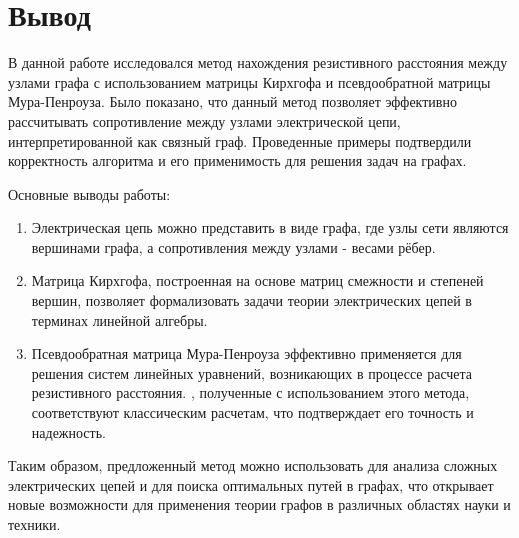 \documentclass{article}
\begin{document}
	
	\section{Вывод}
	В данной работе исследовался метод нахождения резистивного расстояния между узлами графа с использованием матрицы Кирхгофа и псевдообратной матрицы Мура-Пенроуза. Было показано, что данный метод позволяет эффективно рассчитывать сопротивление между узлами электрической цепи, интерпретированной как связный граф. Проведенные примеры подтвердили корректность алгоритма и его применимость для решения задач на графах.
	
	Основные выводы работы:
	\begin{enumerate}
		\item Электрическая цепь можно представить в виде графа, где узлы сети являются вершинами графа, а сопротивления между узлами - весами рёбер.
		\item Матрица Кирхгофа, построенная на основе матриц смежности и степеней вершин, позволяет формализовать задачи теории электрических цепей в терминах линейной алгебры.
		\item Псевдообратная матрица Мура-Пенроуза эффективно применяется для решения систем линейных уравнений, возникающих в процессе расчета резистивного расстояния.
		, полученные с использованием этого метода, соответствуют классическим расчетам, что подтверждает его точность и надежность.
	\end{enumerate}
	

	Таким образом, предложенный метод можно использовать для анализа сложных электрических цепей и для поиска оптимальных путей в графах, что открывает новые возможности для применения теории графов в различных областях науки и техники.
	
	
	
\end{document}
